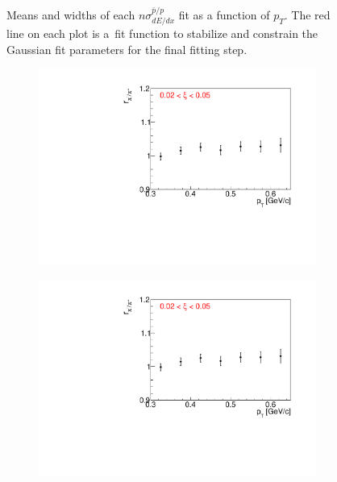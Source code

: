 \begin{figure}[h!]
\begin{subfigure}{.32\textwidth}
		\end{subfigure}
	\caption{Means and widths  of each $n\sigma^{\bar{p}/p}_{dE/dx}$ fit as a function of $p_T$.  The red line on each plot is a~fit function to stabilize and constrain the Gaussian fit parameters for the final fitting step.}
	\label{fig:dEdx_fit_parameters_P}
	
\end{figure}
\begin{figure}[h!]
	\centering
	\begin{subfigure}{.32\textwidth}
		\includegraphics[width=\linewidth, page=3]{chapters/chrgSTAR/img/dEdx/fit2019_fitResult_1_0_step_0.pdf}
	\end{subfigure}
	\begin{subfigure}{.32\textwidth}
		\includegraphics[width=\linewidth, page=4]{chapters/chrgSTAR/img/dEdx/fit2019_fitResult_1_0_step_0.pdf}

\end{subfigure}
\end{figure}
